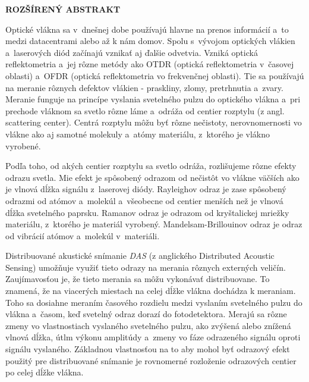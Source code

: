 \cleardoublepage
\noindent
{\large\sffamily\bfseries\MakeUppercase{Rozšírený abstrakt}}

Optické vlákna sa v~dnešnej dobe používajú hlavne na prenos informácií a~to medzi datacentrami alebo až k nám domov. Spolu s~vývojom optických vlákien a~laserových diód začínajú vznikať aj ďalšie odvetvia. Vzniká optická reflektometria a~jej rôzne metódy ako OTDR (optická reflektometria v~časovej oblasti) a~OFDR (optická reflektometria vo frekvenčnej oblasti). Tie sa používajú na meranie rôznych defektov vlákien - praskliny, zlomy, pretrhnutia a~zvary. Meranie funguje na princípe vyslania svetelného pulzu do optického vlákna a~pri prechode vláknom sa svetlo rôzne láme a~odráža od centier rozptylu (z angl. scattering center). Centrá rozptylu môžu byť rôzne nečistoty, nerovnomernosti vo vlákne ako aj samotné molekuly a~atómy materiálu, z~ktorého je vlákno vyrobené.

Podľa toho, od akých centier rozptylu sa svetlo odráža, rozlišujeme rôzne efekty odrazu svetla. Mie efekt je spôsobený odrazom od nečistôt vo vlákne väčších ako je vlnová dĺžka signálu z~laserovej diódy. Rayleighov odraz je zase spôsobený odrazmi od atómov a~molekúl a~všeobecne od centier menších než je vlnová dĺžka svetelného paprsku. Ramanov odraz je odrazom od kryštalickej mriežky materiálu, z~ktorého je materiál vyrobený. Mandelsam-Brillouinov odraz je odraz od vibrácií atómov a~molekúl v~materiáli. 

Distribuované akustické snímanie \textit{DAS} (z anglického Distributed Acoustic Sensing) umožňuje využiť tieto odrazy na merania rôznych externých veličín. Zaujímavosťou je, že tieto merania sa môžu vykonávať distribuovane. To znamená, že na viacerých miestach na celej dĺžke vlákna dochádza k meraniam. Toho sa dosiahne meraním časového rozdielu medzi vyslaním svetelného pulzu do vlákna a~časom, keď svetelný odraz dorazí do fotodetektora. Merajú sa rôzne zmeny vo vlastnostiach vyslaného svetelného pulzu, ako zvýšená alebo znížená vlnová dĺžka, útlm výkonu amplitúdy a~zmeny vo fáze odrazeného signálu oproti signálu vyslaného. Základnou vlastnosťou na to aby mohol byť odrazový efekt použitý pre distribuované snímanie je rovnomerné rozloženie odrazových centier po celej dĺžke vlákna.

